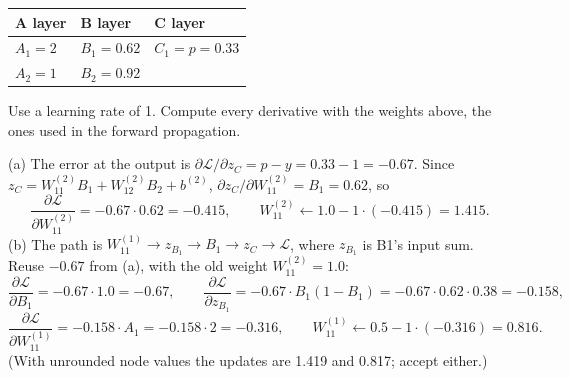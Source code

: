 \documentclass[11pt,addpoints]{exam}
\begin{document}
\begin{questions}
\begin{parts}
\begin{center}
\begin{tabular}{|l|l|l|}
\hline
\rowcolor{headgray} A layer & B layer & C layer \\ \hline
$A_1 = 2$ & $B_1 = 0.62$ & $C_1 = p = 0.33$ \\ \hline
$A_2 = 1$ & $B_2 = 0.92$ & \\ \hline
\end{tabular}
\end{center}
Use a learning rate of 1. Compute every derivative with the weights above, the ones used in the
forward propagation.
\begin{subparts}
\subpart {}
\ifprintanswers\else\newpage\fi   %
\subpart {}
\end{subparts}
\begin{solution}
(a) The error at the output is $\partial \mathcal{L}/\partial z_C = p - y = 0.33 - 1 = -0.67$. Since
$z_C = W^{(2)}_{11} B_1 + W^{(2)}_{12} B_2 + b^{(2)}$, $\partial z_C/\partial W^{(2)}_{11} = B_1 = 0.62$, so
\[
\frac{\partial \mathcal{L}}{\partial W^{(2)}_{11}} = -0.67 \cdot 0.62 = -0.415, \qquad
W^{(2)}_{11} \leftarrow 1.0 - 1 \cdot (-0.415) = 1.415 .
\]
(b) The path is $W^{(1)}_{11} \to z_{B_1} \to B_1 \to z_C \to \mathcal{L}$, where $z_{B_1}$ is B1's input sum.
Reuse $-0.67$ from (a), with the old weight $W^{(2)}_{11} = 1.0$:
\[
\frac{\partial \mathcal{L}}{\partial B_1} = -0.67 \cdot 1.0 = -0.67, \qquad
\frac{\partial \mathcal{L}}{\partial z_{B_1}} = -0.67 \cdot B_1 (1 - B_1) = -0.67 \cdot 0.62 \cdot 0.38 = -0.158,
\]
\[
\frac{\partial \mathcal{L}}{\partial W^{(1)}_{11}} = -0.158 \cdot A_1 = -0.158 \cdot 2 = -0.316, \qquad
W^{(1)}_{11} \leftarrow 0.5 - 1 \cdot (-0.316) = 0.816 .
\]
(With unrounded node values the updates are 1.419 and 0.817; accept either.)
\end{solution}

\ifprintanswers\else\newpage\fi   %

\end{parts}
\end{questions}
\end{document}
